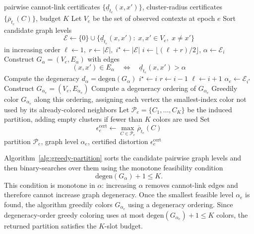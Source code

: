 \documentclass{article}
\theoremstyle{plain}
\theoremstyle{definition}
\theoremstyle{remark}
\newcommand{\eps}{\epsilon}
\begin{document}
\begin{algorithm}[t]
\caption{\textsc{Greedy-Partition}: binary-search epoch partition}
\label{alg:greedy-partition}
\begin{algorithmic}[1]
\Require pairwise cannot-link certificates
  \(\{\underline d_{t_e}(x,x')\}\), cluster-radius certificates
  \(\{\overline\rho_{t_e}(C)\}\), budget \(K\)
\State Let \(V_e\) be the set of observed contexts at epoch \(e\)
\State Sort candidate graph levels
\[
\mathcal E
\gets
\{0\}\cup
\{\underline d_{t_e}(x,x'):\;x,x'\in V_e,\;x\neq x'\}
\]
in increasing order
\State \(\ell\gets 1,\; r\gets |\mathcal E|,\; i^\star\gets |\mathcal E|\)
    \State \(i\gets \lfloor(\ell+r)/2\rfloor\), \(\alpha\gets \mathcal E_i\)
    \State Construct \(G_\alpha=(V_e,E_\alpha)\) with edges
    \[
    (x,x')\in E_\alpha
    \quad\Longleftrightarrow\quad
    \underline d_{t_e}(x,x')>\alpha
    \]
    \State Compute the degeneracy \(d_\alpha=\mathrm{degen}(G_\alpha)\)
        \State \(i^\star\gets i\)
        \State \(r\gets i-1\)
    \Else
        \State \(\ell\gets i+1\)
    \EndIf
\EndWhile
\State \(\alpha_e\gets \mathcal E_{i^\star}\)
\State Construct \(G_{\alpha_e}=(V_e,E_{\alpha_e})\)
\State Compute a degeneracy ordering of \(G_{\alpha_e}\)
\State Greedily color \(G_{\alpha_e}\) along this ordering, assigning each
vertex the smallest-index color not used by its already-colored neighbors
\State Let \(\mathcal P_e=\{C_1,\dots,C_K\}\) be the induced partition,
adding empty clusters if fewer than \(K\) colors are used
\State Set
\[
\eps^{\mathrm{cert}}_e
\gets
\max_{C\in\mathcal P_e}\overline\rho_{t_e}(C)
\]
\State \Return partition \(\mathcal P_e\), graph level \(\alpha_e\),
certified distortion \(\eps^{\mathrm{cert}}_e\)
\end{algorithmic}
\end{algorithm}

Algorithm~\ref{alg:greedy-partition} sorts the candidate pairwise graph
levels and then binary-searches over them using the monotone feasibility
condition
\[
\mathrm{degen}(G_\alpha)+1\le K .
\]
This condition is monotone in \(\alpha\): increasing \(\alpha\) removes
cannot-link edges and therefore cannot increase graph degeneracy. Once the
smallest feasible level \(\alpha_e\) is found, the algorithm greedily colors
\(G_{\alpha_e}\) using a degeneracy ordering. Since degeneracy-order greedy
coloring uses at most \(\mathrm{degen}(G_{\alpha_e})+1\le K\) colors, the
returned partition satisfies the \(K\)-slot budget.
\end{document}
